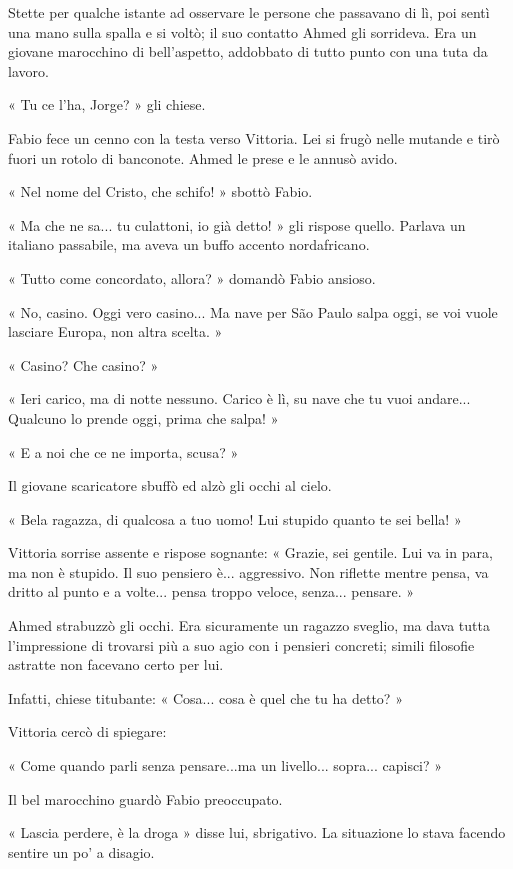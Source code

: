 Stette per qualche istante ad osservare le persone che passavano di lì, poi sentì una mano sulla spalla e si voltò; il suo contatto Ahmed gli sorrideva. Era un giovane marocchino di bell'aspetto, addobbato di tutto punto con una tuta da lavoro.

« Tu ce l'ha, Jorge? » gli chiese.

Fabio fece un cenno con la testa verso Vittoria. Lei si frugò nelle mutande e tirò fuori un rotolo di banconote. Ahmed le prese e le annusò avido.

« Nel nome del Cristo, che schifo! » sbottò Fabio.

« Ma che ne sa... tu culattoni, io già detto! » gli rispose quello. Parlava un italiano passabile, ma aveva un buffo accento nordafricano.

« Tutto come concordato, allora? » domandò Fabio ansioso.

« No, casino. Oggi vero casino... Ma nave per São Paulo salpa oggi, se voi vuole lasciare Europa, non altra scelta. »

« Casino? Che casino? »

« Ieri carico, ma di notte nessuno. Carico è lì, su nave che tu vuoi andare... Qualcuno lo prende oggi, prima che salpa! »

« E a noi che ce ne importa, scusa? »

Il giovane scaricatore sbuffò ed alzò gli occhi al cielo.

« Bela ragazza, di qualcosa a tuo uomo! Lui stupido quanto te sei bella! »

Vittoria sorrise assente e rispose sognante: « Grazie, sei gentile. Lui va in para, ma non è stupido. Il suo pensiero è... aggressivo. Non riflette mentre pensa, va dritto al punto e a volte... pensa troppo veloce, senza... pensare. »

Ahmed strabuzzò gli occhi. Era sicuramente un ragazzo sveglio, ma dava tutta l'impressione di trovarsi più a suo agio con i pensieri concreti; simili filosofie astratte non facevano certo per lui.

Infatti, chiese titubante: « Cosa... cosa è quel che tu ha detto? »

Vittoria cercò di spiegare:

« Come quando parli senza pensare...ma un livello... sopra... capisci? »

Il bel marocchino guardò Fabio preoccupato.

« Lascia perdere, è la droga » disse lui, sbrigativo. La situazione lo stava facendo sentire un po' a disagio.


